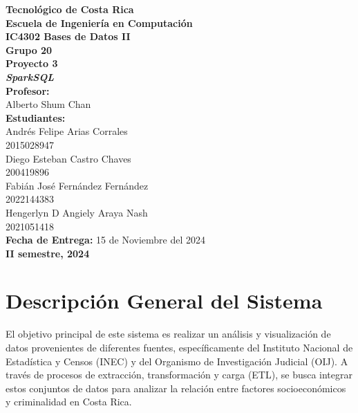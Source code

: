 \documentclass{article}
\begin{document}
\begin{titlepage}
    \centering
    {\Large\textbf{Tecnológico de Costa Rica}}\\[0.5cm]
    {\Large\textbf{Escuela de Ingeniería en Computación}}\\[0.5cm]
    {\Large\textbf{IC4302 Bases de Datos II}}\\[0.5cm]
    {\Large\textbf{Grupo 20}}\\[2cm]

    {\Large\bfseries Proyecto 3}\\[0.5cm]
    {\Large\bfseries \emph{SparkSQL}}\\[2cm]

    \textbf{\large Profesor:}\\
    \large Alberto Shum Chan \\[1.5cm]

    \textbf{\large Estudiantes:}\\[0.5cm]
    \large Andrés Felipe Arias Corrales\\
    2015028947\\[0.5cm]
    \large Diego Esteban Castro Chaves\\
    200419896\\[0.5cm]
    \large Fabián José Fernández Fernández\\
    2022144383\\[0.5cm]
    \large Hengerlyn D Angiely Araya Nash\\
    2021051418\\[2cm]

    \textbf{\large Fecha de Entrega:} 15 de Noviembre del 2024\\[0.5cm]
    \textbf{\large II semestre, 2024}
\end{titlepage}

\newpage
\tableofcontents
\newpage

\section{Descripción General del Sistema}

El objetivo principal de este sistema es realizar un análisis y visualización de datos provenientes de diferentes fuentes, específicamente del Instituto Nacional de Estadística y Censos (INEC) y del Organismo de Investigación Judicial (OIJ). A través de procesos de extracción, transformación y carga (ETL), se busca integrar estos conjuntos de datos para analizar la relación entre factores socioeconómicos y criminalidad en Costa Rica.
\end{document}
